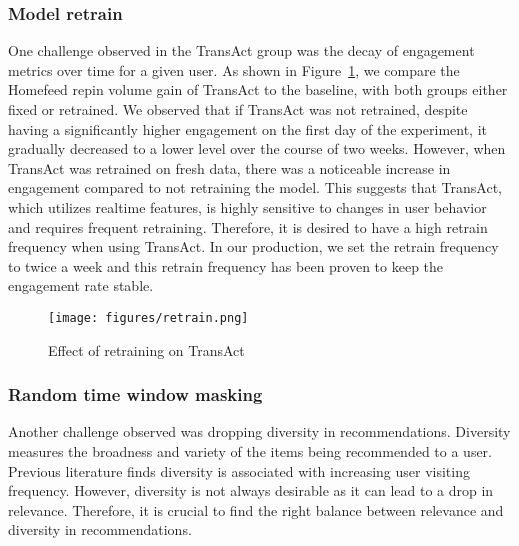 \subsubsection{Model retrain}
\label{sec:retrain_exp}
One challenge observed in the TransAct group was the decay of engagement metrics over time for a given user.
As shown in Figure~\ref{fig:retrain1}, we compare the Homefeed repin volume gain of TransAct to the baseline, with both groups either fixed or retrained.
We observed that if TransAct was not retrained, despite having a significantly higher engagement on the first day of the experiment, it gradually decreased to a lower level over the course of two weeks. 
However, when TransAct was retrained on fresh data, there was a noticeable increase in engagement compared to not retraining the model. 
This suggests that TransAct, which utilizes realtime features, is highly sensitive to changes in user behavior and requires frequent retraining. 
Therefore, it is desired to have a high retrain frequency when using TransAct. In our production, we set the retrain frequency to twice a week and this retrain frequency has been proven to keep the engagement rate stable.
\begin{figure}[h]
  \centering
  \texttt{[image: figures/retrain.png]}
  \caption{Effect of retraining on TransAct}
  \label{fig:retrain1}
\end{figure}





\subsubsection{Random time window masking}

Another challenge observed was dropping diversity in recommendations. Diversity measures the broadness and variety of the items being recommended to a user. Previous literature\cite{gg_surrogate} finds diversity is associated with increasing user visiting frequency. However, diversity is not always desirable as it can lead to a drop in relevance. Therefore, it is crucial to find the right balance between relevance and diversity in recommendations.


